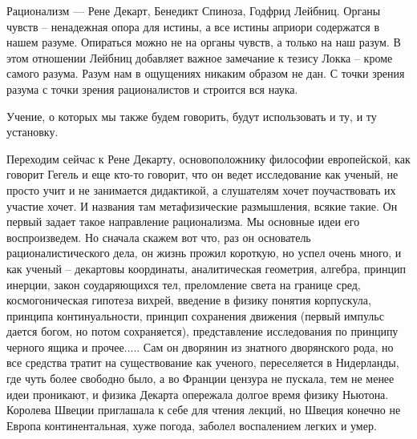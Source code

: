 \documentclass[a4paper, 12pt]{article}
\begin{document}
Рационализм --- Рене Декарт, Бенедикт Спиноза, Годфрид Лейбниц. Органы 
чувств -- ненадежная опора для истины, а все истины априори содержатся 
в нашем разуме. Опираться можно не на органы чувств, а только на наш 
разум. В этом отношении Лейбниц добавляет важное замечание к тезису 
Локка -- кроме самого разума. Разум нам в ощущениях никаким образом не 
дан. С точки зрения разума с точки зрения рационалистов и строится вся 
наука.

Учение, о которых мы также будем говорить, будут использовать и ту, и ту 
установку.

Переходим сейчас к Рене Декарту, основоположнику философии европейской, 
как говорит Гегель и еще кто-то говорит, что он ведет исследование как 
ученый, не просто учит и не занимается дидактикой, а слушателям хочет 
поучаствовать их участие хочет. И названия там метафизические 
размышления, всякие такие. Он первый задает такое направление 
рационализма. Мы основные идеи его воспроизведем. Но сначала скажем вот 
что, раз он основатель рационалистического дела, он жизнь прожил 
короткую, но успел очень много, и как ученый -- декартовы координаты, 
аналитическая геометрия, алгебра, принцип инерции, закон соударяющихся 
тел, преломление света на границе сред, космогоническая гипотеза вихрей, 
введение в физику понятия корпускула, принципа континуальности, принцип 
сохранения движения (первый импульс дается богом, но потом сохраняется), 
представление исследования по принципу черного ящика и прочее..... Сам 
он дворянин из знатного дворянского рода, но все средства тратит на 
существование как ученого, переселяется в Нидерланды, где чуть более 
свободно было, а во Франции цензура не пускала, тем не менее идеи 
проникают, и физика Декарта опережала долгое время физику Ньютона. 
Королева Швеции приглашала к себе для чтения лекций, но Швеция конечно 
не Европа континентальная, хуже погода, заболел воспалением легких 
и умер.
\end{document}
